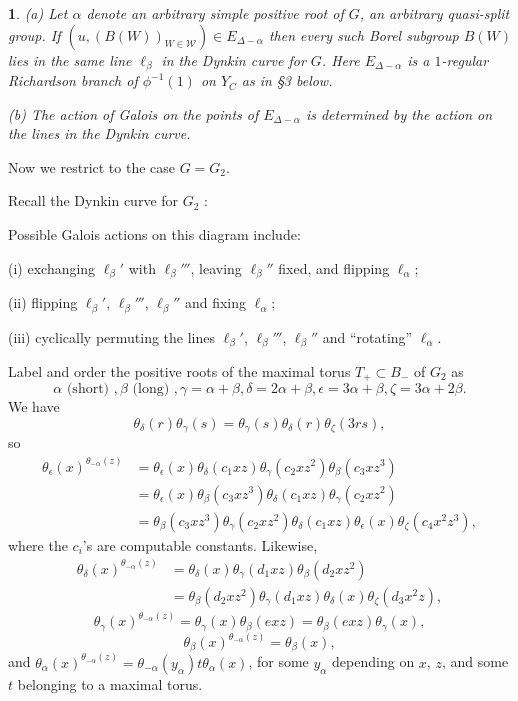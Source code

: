 \documentclass[12pt,letterpaper]{amsart}
\newcommand{\eps}{\epsilon}
\newcommand{\proclaimname}{}
\newtheorem*{proclaimx}{\proclaimname}
\newenvironment{proclaim}[1]%
  {\renewcommand{\proclaimname}{#1}\begin{proclaimx}}{\end{proclaimx}}
\begin{document}
\begin{proclaim}{Lemma 2.10 \cite[pf of Lemma 5.3]{Ha89}}
(a) Let $\alpha$ denote an
arbitrary simple positive root of $G$, an arbitrary quasi-split group. If
$(u,(B(W))_{W\in {\mathcal W}})\in E_{\Delta-\alpha}$
then every such Borel subgroup $B(W)$ lies in the same line $\ell_\beta$
in the Dynkin curve for $G$. Here
$E_{\Delta-\alpha}$ is a $1$-regular Richardson branch
of $\phi^{-1}(1)$ on $Y_C$ as in \S 3 below.

(b) The action of Galois on the points of $E_{\Delta-\alpha}$
is determined by the action on the lines in the Dynkin curve.
\end{proclaim}

Now we restrict to the case $G=G_2$.

Recall the Dynkin curve for $G_2$ \cite{St74}:

\vspace{0.4in}

\noindent
Possible Galois actions on this diagram include:

\noindent
(i) exchanging $\ell_\beta'$ with $\ell_\beta'''$, leaving
$\ell_\beta''$ fixed, and flipping $\ell_\alpha$;

\noindent
(ii) flipping $\ell_\beta'$, $\ell_\beta'''$, $\ell_\beta''$
and fixing $\ell_\alpha$;

\noindent
(iii) cyclically permuting the lines $\ell_\beta'$,
$\ell_\beta'''$, $\ell_\beta''$
and ``rotating'' $\ell_\alpha$.

Label and order the positive roots of the maximal torus
$T_+\subset B_-$ of $G_2$ as
\[
\alpha \text{  (short) },\beta \text{  (long) },
\gamma=\alpha +\beta, \delta =2\alpha +\beta,
\epsilon =3\alpha +\beta,  \zeta=3\alpha +2\beta .
\]
We have
\[
\theta_\delta(r)\theta_\gamma(s)=\theta_\gamma(s)\theta_\delta(r)\theta_{\zeta}(3rs),
\]
so
\[
\begin{split}
\theta_{\eps}(x)^{\theta_{-\alpha}(z)}
&=\theta_{\eps}(x)\theta_\delta(c_1xz)\theta_\gamma(c_2xz^2)
\theta_\beta(c_3xz^3)\\
&=\theta_{\eps}(x)\theta_\beta(c_3xz^3)\theta_\delta(c_1xz)\theta_\gamma(c_2xz^2)\\
&=\theta_\beta(c_3xz^3)\theta_\gamma(c_2xz^2)\theta_\delta(c_1xz)\theta_{\eps}(x)
\theta_\zeta(c_4x^2z^3),
\end{split}
\]
where the $c_i$'s are computable constants. Likewise,
\[
\begin{split}
\theta_{\delta}(x)^{\theta_{-\alpha}(z)}
&=\theta_{\delta}(x)\theta_\gamma(d_1xz)\theta_\beta(d_2xz^2)\\
&=\theta_\beta(d_2xz^2)\theta_\gamma(d_1xz)\theta_{\delta}(x)\theta_\zeta(d_3x^2z),
\end{split}
\]
\[
\theta_{\gamma}(x)^{\theta_{-\alpha}(z)}
=\theta_{\gamma}(x)\theta_\beta(exz)=\theta_\beta(exz)\theta_{\gamma}(x),
\]
\[
\theta_{\beta}(x)^{\theta_{-\alpha}(z)}=\theta_{\beta}(x),
\]
and $\theta_{\alpha}(x)^{\theta_{-\alpha}(z)}=
\theta_{-\alpha}(y_\alpha)t\theta_{\alpha}(x)$, for some $y_\alpha$ depending on $x$,
$z$, and some $t$ belonging to a
maximal torus.
\end{document}
